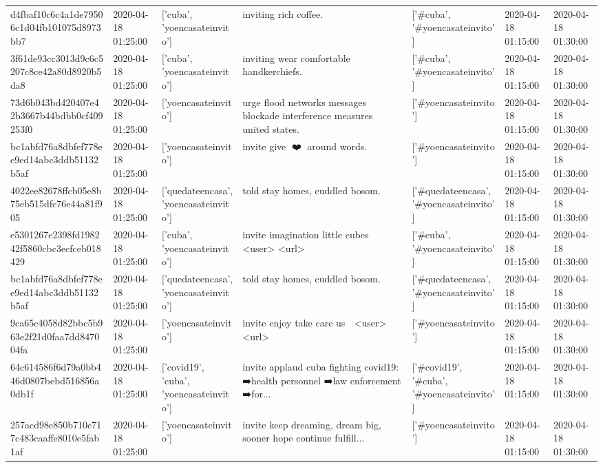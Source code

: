 \begin{tabular}{lllllll}
d4fbaf10c6c4a1de79506c1d04fb101075d8973bb7 & 2020-04-18 01:25:00 & ['cuba', 'yoencasateinvito'] & inviting rich coffee. & ['#cuba', '#yoencasateinvito'] & 2020-04-18 01:15:00 & 2020-04-18 01:30:00 \\
3f61de93cc3013d9c6c5207c8ce42a80d8920b5da8 & 2020-04-18 01:25:00 & ['cuba', 'yoencasateinvito'] & inviting wear comfortable handkerchiefs. & ['#cuba', '#yoencasateinvito'] & 2020-04-18 01:15:00 & 2020-04-18 01:30:00 \\
73d6b043bd420407e42b3667b44bdbb0cf409253f0 & 2020-04-18 01:25:00 & ['yoencasateinvito'] & urge flood networks messages blockade interference measures united states. & ['#yoencasateinvito'] & 2020-04-18 01:15:00 & 2020-04-18 01:30:00 \\
bc1abfd76a8dbfef778ee9ed14abc3ddb51132b5af & 2020-04-18 01:25:00 & ['yoencasateinvito'] & invite give 💚❤️💜 around words. & ['#yoencasateinvito'] & 2020-04-18 01:15:00 & 2020-04-18 01:30:00 \\
4022ee82678ffcb05e8b75eb515dfc76e44a81f905 & 2020-04-18 01:25:00 & ['quedateencasa', 'yoencasateinvito'] & told stay homes, cuddled bosom. & ['#quedateencasa', '#yoencasateinvito'] & 2020-04-18 01:15:00 & 2020-04-18 01:30:00 \\
e5301267e2398fd198242f5860cbc3ecfceb018429 & 2020-04-18 01:25:00 & ['cuba', 'yoencasateinvito'] & invite imagination little cubes <user> <url> & ['#cuba', '#yoencasateinvito'] & 2020-04-18 01:15:00 & 2020-04-18 01:30:00 \\
bc1abfd76a8dbfef778ee9ed14abc3ddb51132b5af & 2020-04-18 01:25:00 & ['quedateencasa', 'yoencasateinvito'] & told stay homes, cuddled bosom. & ['#quedateencasa', '#yoencasateinvito'] & 2020-04-18 01:15:00 & 2020-04-18 01:30:00 \\
9ca65c4058d82bbc5b963e2f21d0faa7dd847004fa & 2020-04-18 01:25:00 & ['yoencasateinvito'] & invite enjoy take care us 🌹 <user> <url> & ['#yoencasateinvito'] & 2020-04-18 01:15:00 & 2020-04-18 01:30:00 \\
64c614586f6d79a0bb446d0807bebd516856a0db1f & 2020-04-18 01:25:00 & ['covid19', 'cuba', 'yoencasateinvito'] & invite applaud cuba fighting covid19: ➡️health personnel ➡️law enforcement ➡️for... & ['#covid19', '#cuba', '#yoencasateinvito'] & 2020-04-18 01:15:00 & 2020-04-18 01:30:00 \\
257acd98e850b710c717c483caaffe8010e5fab1af & 2020-04-18 01:25:00 & ['yoencasateinvito'] & invite keep dreaming, dream big, sooner hope continue fulfill... & ['#yoencasateinvito'] & 2020-04-18 01:15:00 & 2020-04-18 01:30:00 \\

\end{tabular}
